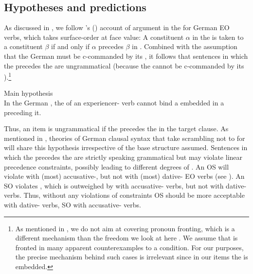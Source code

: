 \documentclass[output=paper,colorlinks,citecolor=brown]{langscibook}
\begin{document}
\subsection{Hypotheses and predictions}
\label{sec:hypotheses:Masloch}

As discussed in , we follow \citeauthor{masloch_not_2024}'s (\citeyear{masloch_not_2024}) account of argument  in the  for German EO verbs, which takes surface-order at face value: A constituent $α$ in the  is taken to  a constituent $β$ if and only if $α$ precedes $β$ in .
Combined with the assumption that the German   must be c-commanded by its , it follows that sentences in which the  precedes the  are ungrammatical (because the  cannot be c-commanded by its ).\footnote{As mentioned in , we do not aim at covering pronoun fronting, which is a different mechanism than the  freedom we look at here \parencite{haider_mittelfeld_2017}. We assume that  is fronted in many apparent counterexamples to a  condition. For our purposes, the precise mechanism behind such cases is irrelevant since in our items the  is embedded.}

\begin{exe}
    \ex Main hypothesis \label{ex:mainhypothesis:Masloch}\\
    In the German , the  of an experiencer- verb cannot bind a  embedded in a  preceding it.
\end{exe}

Thus, an item is ungrammatical if the  precedes the  in the target clause.
As mentioned in , theories of German clausal syntax that take scrambling not to  for   will share this hypothesis irrespective of the base structure assumed.
Sentences in which the  precedes the  are strictly speaking grammatical but may violate linear precedence constraints, possibly leading to different degrees of .
An OS  will violate  with (most) accusative-, but not with (most) dative- EO verbs (see ).
An SO  violates , which is outweighed by  with accusative- verbs, but not with dative- verbs.
Thus, without any violations of  constraints OS should be more acceptable with dative- verbs, SO with accusative- verbs.
\end{document}
